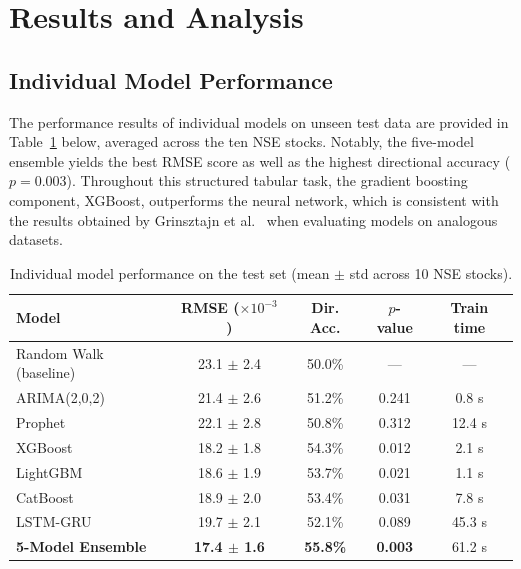 \documentclass[10pt,a4paper,twoside]{article}
\begin{document}
\section{Results and Analysis}
\label{sec:results}

\subsection{Individual Model Performance}

The performance results of individual models on unseen test data are provided in Table~\ref{tab:model_perf} below, averaged across the ten NSE stocks. Notably, the five-model ensemble yields the best RMSE score as well as the highest directional accuracy ($p = 0.003$). Throughout this structured tabular task, the gradient boosting component, XGBoost, outperforms the neural network, which is consistent with the results obtained by Grinsztajn et al.~\cite{grinsztajn2022} when evaluating models on analogous datasets.

\begin{table}[htb]
  \begin{center}
    {\caption{Individual model performance on the test set (mean $\pm$ std across
    10 NSE stocks).}\label{tab:model_perf}}
    \begin{tabular}{|l|c|c|c|c|}
    \hline
    \textbf{Model} & \textbf{RMSE ($\times 10^{-3}$)} & \textbf{Dir. Acc.} & \textbf{$p$-value} & \textbf{Train time} \\
    \hline
    Random Walk (baseline) & 23.1 $\pm$ 2.4 & 50.0\% & --- & --- \\
    ARIMA(2,0,2) & 21.4 $\pm$ 2.6 & 51.2\% & 0.241 & 0.8 s \\
    Prophet & 22.1 $\pm$ 2.8 & 50.8\% & 0.312 & 12.4 s \\
    XGBoost & 18.2 $\pm$ 1.8 & 54.3\% & 0.012 & 2.1 s \\
    LightGBM & 18.6 $\pm$ 1.9 & 53.7\% & 0.021 & 1.1 s \\
    CatBoost & 18.9 $\pm$ 2.0 & 53.4\% & 0.031 & 7.8 s \\
    LSTM-GRU & 19.7 $\pm$ 2.1 & 52.1\% & 0.089 & 45.3 s \\
    \textbf{5-Model Ensemble} & \textbf{17.4 $\pm$ 1.6} & \textbf{55.8\%} & \textbf{0.003} & 61.2 s \\
    \hline
    \end{tabular}
  \end{center}
\end{table}
\end{document}
